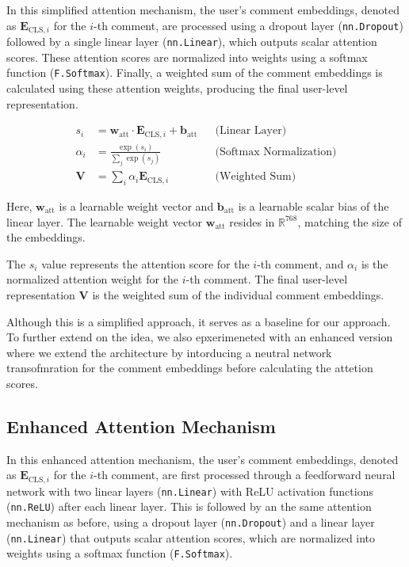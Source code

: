\documentclass[twoside]{ctuthesis}
\theoremstyle{plain}
\theoremstyle{definition}
\theoremstyle{note}
\begin{document}
In this simplified attention mechanism, the user's comment embeddings, denoted as \( \mathbf{E}_{\mathrm{CLS}, i} \) for the \( i \)-th comment, are processed using a dropout layer (\texttt{nn.Dropout}) followed by a single linear layer (\texttt{nn.Linear}), which outputs scalar attention scores. These attention scores are normalized into weights using a softmax function (\texttt{F.Softmax}). Finally, a weighted sum of the comment embeddings is calculated using these attention weights, producing the final user-level representation. \par

\begin{align}
    s_i &= \mathbf{w}_{\mathrm{att}} \cdot \mathbf{E}_{\mathrm{CLS}, i} + \mathbf{b}_{\mathrm{att}} && \text{(Linear Layer)} \\
    \alpha_i &= \frac{\exp(s_i)}{\sum_{j} \exp(s_j)} && \text{(Softmax Normalization)} \\
    \mathbf{V} &= \sum_i \alpha_i \mathbf{E}_{\mathrm{CLS}, i} && \text{(Weighted Sum)}
\end{align}

Here, \( \mathbf{w}_{\mathrm{att}} \) is a learnable weight vector and  \( \mathbf{b}_{\mathrm{att}} \) is a learnable scalar bias of the linear layer. The learnable weight vector \( \mathbf{w}_{\mathrm{att}} \) resides in \( \mathbb{R}^{768} \), matching the size of the embeddings.

The \( s_i \) value represents the attention score for the \( i \)-th comment, and \( \alpha_i \) is the normalized attention weight for the \( i \)-th comment. The final user-level representation \( \mathbf{V} \) is the weighted sum of the individual comment embeddings.\par

Although this is a simplified approach, it serves as a baseline for our approach. To further extend on the idea, we also epxerimeneted with an enhanced version where we extend the architecture by intorducing a neutral network transofmration for the comment embeddings before calculating the attetion scores.

\subsection{Enhanced Attention Mechanism}
\label{sec:enhanced_attention}
In this enhanced attention mechanism, the user's comment embeddings, denoted as \( \mathbf{E}_{\mathrm{CLS}, i} \) for the \( i \)-th comment, are first processed through a feedforward neural network with two linear layers (\texttt{nn.Linear}) with ReLU activation functions (\texttt{nn.ReLU}) after each linear layer. This is followed by an the same attention mechanism as before, using a dropout layer (\texttt{nn.Dropout}) and a linear layer (\texttt{nn.Linear}) that outputs scalar attention scores, which are normalized into weights using a softmax function (\texttt{F.Softmax}).\par
\end{document}
